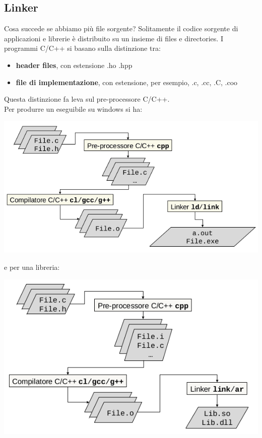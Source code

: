 \documentclass[a4paper,12pt, oneside]{book}
\begin{document}
\subsection{Linker}
Cosa succede se abbiamo più file sorgente? Solitamente il codice sorgente di applicazioni e librerie è distribuito su un insieme di files e directories. I programmi C/C++ si basano sulla distinzione tra:
\begin{itemize}
\item \textbf{header files}, con estensione .ho .hpp
\item \textbf{file di implementazione}, con estensione, per esempio, .c, .cc, .C, .coo
\end{itemize}
Questa distinzione fa leva sul pre-processore C/C++.\\
Per produrre un eseguibile su windows si ha:
\begin{center}
\includegraphics[scale=2.5]{img/c4.png}
\end{center}
e per una libreria:
\begin{center}
\includegraphics[scale=2.5]{img/c5.png}
\end{center}
\end{document}
